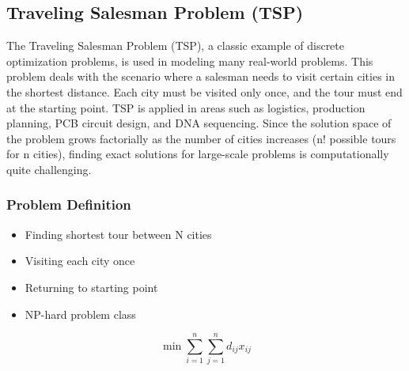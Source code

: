 \subsection{Traveling Salesman Problem (TSP)}
The Traveling Salesman Problem (TSP), a classic example of discrete optimization problems, is used in modeling many real-world problems. This problem deals with the scenario where a salesman needs to visit certain cities in the shortest distance. Each city must be visited only once, and the tour must end at the starting point. TSP is applied in areas such as logistics, production planning, PCB circuit design, and DNA sequencing. Since the solution space of the problem grows factorially as the number of cities increases (n! possible tours for n cities), finding exact solutions for large-scale problems is computationally quite challenging.

\subsubsection{Problem Definition}
\begin{itemize}
    \item Finding shortest tour between N cities
    \item Visiting each city once
    \item Returning to starting point
    \item NP-hard problem class
\end{itemize}

\begin{equation}
\min \sum_{i=1}^n \sum_{j=1}^n d_{ij}x_{ij}
\end{equation}

